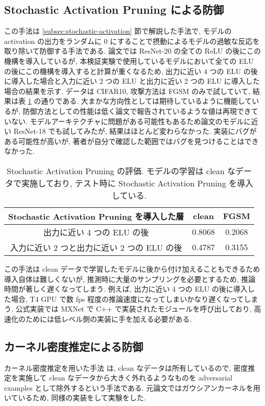 \subsection{Stochastic Activation Pruning による防御}
\label{subsec:exp-sap}
この手法は \ref{subsec:stochastic-activation} 節で解説した手法で, モデルの activation の出力をランダムに 0 にすることで摂動によるモデルの過敏な反応を取り除いて防御する手法である.
論文では ResNet-20 の全ての ReLU の後にこの機構を導入しているが, 本検証実験で使用しているモデルにおいて全ての ELU の後にこの機構を導入すると計算が重くなるため, 出力に近い 4 つの ELU の後に導入した場合と入力に近い 2 つの ELU と出力に近い 2 つの ELU に導入した場合の結果を示す.
データは CIFAR10, 攻撃方法は FGSM のみで試していて, 結果は表 \ref{tb:exp-adv-sap} の通りである.
大まかな方向性としては期待しているように機能しているが, 防御方法としての性能は低く論文で報告されているような値は再現できていない.
モデルアーキテクチャに問題がある可能性もあるため論文のモデルに近い ResNet-18 でも試してみたが, 結果はほとんど変わらなかった.
実装にバグがある可能性が高いが, 著者が自分で確認した範囲ではバグを見つけることはできなかった.
%
\begin{table}[htbp]
\begin{center}
\begin{tabular}{|c|c|c|}
\hline
Stochastic Activation Pruning を導入した層 & clean & FGSM \\
\hline
\hline
出力に近い 4 つの ELU の後 & 0.8068 & 0.2068\\
\hline
入力に近い 2 つと出力に近い 2 つの ELU の後 & 0.4787 & 0.3155\\
\hline
\end{tabular}
\caption{
Stochastic Activation Pruning の評価.
モデルの学習は clean なデータで実施しており, テスト時に Stochastic Activation Pruning を導入している.
}
\label{tb:exp-adv-sap}
\end{center}
\end{table}
%

この手法は clean データで学習したモデルに後から付け加えることもできるため導入自体は難しくないが, 推測時に大量のサンプリングを必要とするため, 推論時間が著しく遅くなってしまう.
例えば, 出力に近い 4 つの ELU の後に導入した場合, T4 GPU で数 fps 程度の推論速度になってしまいかなり遅くなってしまう.
公式実装では MXNet で C++ で実装されたモジュールを呼び出しており, 高速化のためには低レベル側の実装に手を加える必要がある.



\subsection{カーネル密度推定による防御}
\label{subsec:exp-kde}
カーネル密度推定を用いた手法 \cite{feinman2017detecting} は, clean なデータは所有しているので, 密度推定を実施して clean なデータから大きく外れるようなものを adversarial examples として除外するという手法である.
元論文ではガウシアンカーネルを用いているため, 同様の実装をして実験をした.

